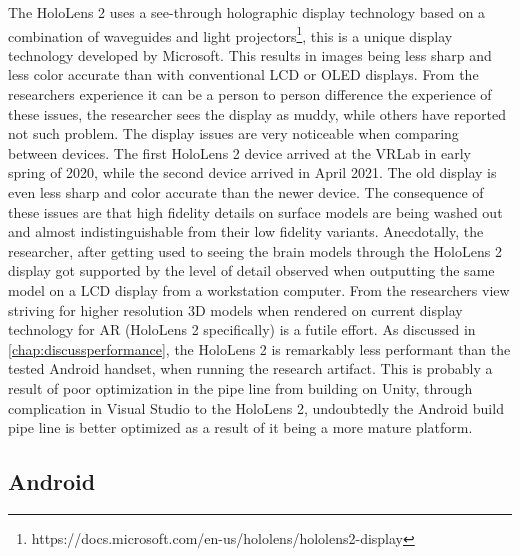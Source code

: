 The HoloLens 2 uses a see-through holographic display technology based on a combination of waveguides and light projectors\footnote{https://docs.microsoft.com/en-us/hololens/hololens2-display}, this is a unique display technology developed by Microsoft. This results in images being less sharp and less color accurate than with conventional LCD or OLED displays. From the researchers experience it can be a person to person difference the experience of these issues, the researcher sees the display as muddy, while others have reported not such problem. The display issues are very noticeable when comparing between devices. The first HoloLens 2 device arrived at the VRLab in early spring of 2020, while the second device arrived in April 2021. The old display is even less sharp and color accurate than the newer device.
The consequence of these issues are that high fidelity details on surface models are being washed out and almost indistinguishable from their low fidelity variants. Anecdotally, the researcher, after getting used to seeing the brain models through the HoloLens 2 display got supported by the level of detail observed when outputting the same model on a LCD display from a workstation computer. From the researchers view striving for higher resolution 3D models when rendered on current display technology for AR (HoloLens 2 specifically) is a futile effort.
As discussed in \autoref{chap:discussperformance}, the HoloLens 2 is remarkably less performant than the tested Android handset, when running the research artifact. This is probably a result of poor optimization in the pipe line from building on Unity, through complication in Visual Studio to the HoloLens 2, undoubtedly the Android build pipe line is better optimized as a result of it being a more mature platform.

\subsection{Android}

